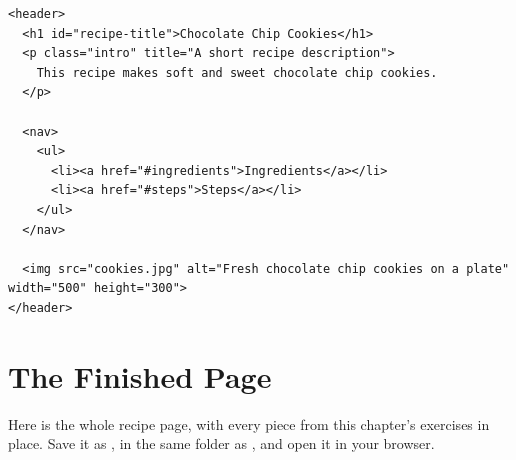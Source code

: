 \begin{Answer}[ref=html-images1]
\begin{verbatim}
<header>
  <h1 id="recipe-title">Chocolate Chip Cookies</h1>
  <p class="intro" title="A short recipe description">
    This recipe makes soft and sweet chocolate chip cookies.
  </p>

  <nav>
    <ul>
      <li><a href="#ingredients">Ingredients</a></li>
      <li><a href="#steps">Steps</a></li>
    </ul>
  </nav>

  <img src="cookies.jpg" alt="Fresh chocolate chip cookies on a plate" width="500" height="300">
</header>
\end{verbatim}
\end{Answer}

\section{The Finished Page}
Here is the whole recipe page, with every piece from this chapter's exercises in place. Save it as
, in the same folder as , and open it in your browser.

